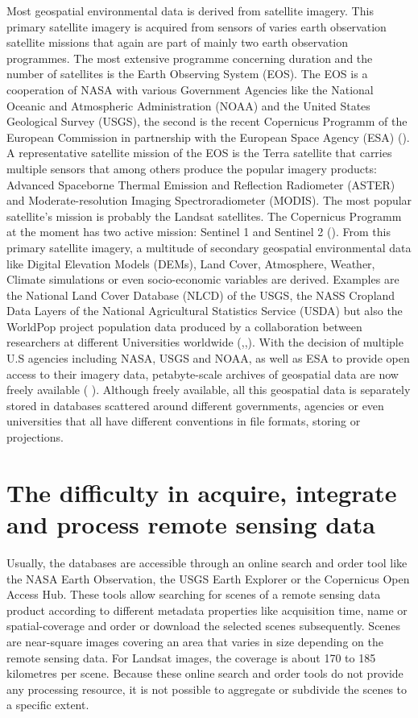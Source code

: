 Most geospatial environmental data is derived from satellite imagery. This primary satellite imagery is acquired from sensors of varies earth observation satellite missions that again are part of mainly two earth observation programmes. The most extensive programme concerning duration and the number of satellites is the Earth Observing System (EOS). The EOS is a cooperation of NASA with various Government Agencies like the National Oceanic and Atmospheric Administration (NOAA) and the United States Geological Survey (USGS), the second is the recent Copernicus Programm of the European Commission in partnership with the European Space Agency (ESA) (\cite{salomonson2002overview}). A representative satellite mission of the EOS is the Terra satellite that carries multiple sensors that among others produce the popular imagery products: Advanced Spaceborne Thermal Emission and Reflection Radiometer (ASTER) and Moderate-resolution Imaging Spectroradiometer (MODIS). The most popular satellite's mission is probably the Landsat satellites. The Copernicus Programm at the moment has two active mission: Sentinel 1 and Sentinel 2 (\cite{butler2014earth}).
From this primary satellite imagery, a multitude of secondary geospatial environmental data like Digital Elevation Models (DEMs), Land Cover, Atmosphere, Weather, Climate simulations or even socio-economic variables are derived. Examples are the National Land Cover Database (NLCD) of the USGS, the NASS Cropland Data Layers of the National Agricultural Statistics Service (USDA) but also the WorldPop project population data produced by a collaboration between researchers at different Universities worldwide (\cite{homer2007completion},\cite{johnson20102009},\cite{tatem2017worldpop}). 
With the decision of multiple U.S agencies including NASA, USGS and NOAA, as well as ESA to provide open access to their imagery data, petabyte-scale archives of geospatial data are now freely available (\cite{gorelick2017google} ).
Although freely available, all this geospatial data is separately stored in databases scattered around different governments, agencies or even universities that all have different conventions in file formats, storing or projections. 

\section{The difficulty in acquire, integrate and process remote sensing data}

Usually, the databases are accessible through an online search and order tool like the NASA Earth Observation, the USGS Earth Explorer or the Copernicus Open Access Hub. These tools allow searching for scenes of a remote sensing data product according to different metadata properties like acquisition time, name or spatial-coverage and order or download the selected scenes subsequently. 
Scenes are near-square images covering an area that varies in size depending on the remote sensing data. For Landsat images, the coverage is about 170 to 185 kilometres per scene. Because these online search and order tools do not provide any processing resource, it is not possible to aggregate or subdivide the scenes to a specific extent.

